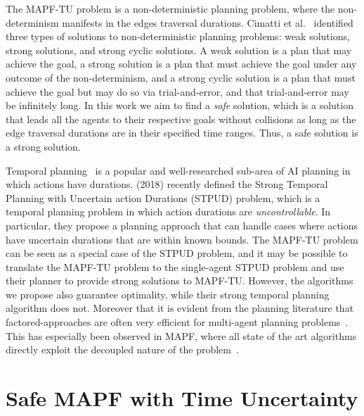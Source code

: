 \documentclass[jair,twoside,11pt,theapa]{article}
\newcommand{\mapftu}{MAPF-TU\xspace}
\begin{document}
The \mapftu problem is a non-deterministic planning problem, where the non-determinism manifests in the edges traversal durations. 
Cimatti et al.~\citeyear{cimatti2003weak} identified three types of solutions to non-deterministic planning problems: weak solutions, strong solutions, and strong cyclic solutions. 
A weak solution is a plan that may achieve the goal, a strong solution is a plan that must achieve the goal under any outcome of the non-determinism, 
and a strong cyclic solution is a plan that must achieve the goal but may do so via trial-and-error, and that trial-and-error may be infinitely long. 
In this work we aim to find a \emph{safe} solution, which is a solution that leads all the agents to their respective goals without collisions as long as the edge traversal durations are in their specified time ranges. 
Thus, a safe solution is a strong solution. 


Temporal planning~ is a popular and well-researched sub-area of AI planning in which 
actions have durations. \citeauthor{CimattiDMRS18} (2018) recently 
defined the Strong Temporal Planning with Uncertain action Durations (STPUD) problem, which is a temporal planning problem in which action durations are \emph{uncontrollable}. 
In particular, they propose a planning approach that can handle cases where actions have uncertain durations that are within known bounds. 
The \mapftu problem can be seen as a special case of the STPUD problem, and it may be possible to translate the \mapftu problem to the single-agent STPUD problem and use their planner to provide strong solutions to MAPF-TU. 
However, the algorithms we propose also guarantee optimality, while their strong temporal planning algorithm does not. 
Moreover that it is evident from the planning literature that factored-approaches are often very efficient for multi-agent planning problems~. 
This has especially been observed in MAPF, where all state of the art algorithms directly exploit the decoupled nature of the problem~. 








\section{Safe MAPF with Time Uncertainty}
\label{mapftu}
\end{document}
